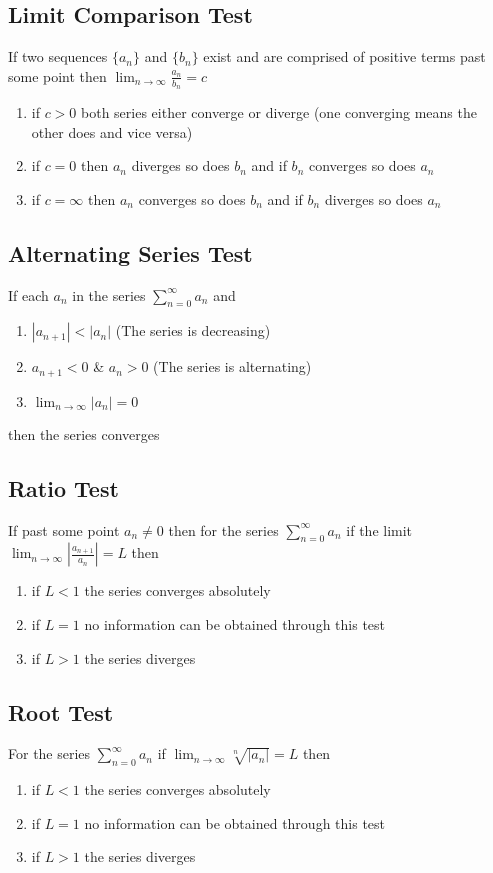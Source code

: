 \documentclass[10pt,landscape,letterpaper]{cheatsheet}
\begin{document}
\subsection*{Limit Comparison Test}
If two sequences $\{a_n\}$ and $\{b_n\}$ exist and are comprised of positive terms past some point then
$\lim_{n \to \infty} \frac{a_n}{b_n} =c$
\begin{enumerate}[label=(\alph*)]
        \item if $c>0$ both series either converge or diverge (one converging means the other does and vice versa)
        \item if $c=0$ then $a_n$ diverges so does $b_n$ and if $b_n$ converges so does $a_n$
        \item if $c=\infty$ then $a_n$ converges so does $b_n$ and if $b_n$ diverges so does $a_n$
\end{enumerate}
\subsection*{Alternating Series Test}
If each $a_n$ in the series $\sum_{n=0}^{\infty}a_n$ and
\begin{enumerate}[label=(\arabic*)]
        \item $|a_{n+1}|<|a_n|$ (The series is decreasing)
        \item $a_{n+1}<0$ \& $a_n>0$ (The series is alternating)
        \item $\lim_{n \to \infty} |a_n|=0$
\end{enumerate}
then the series converges
\subsection*{Ratio Test}
If past some point $a_n\neq 0$ then for the series $\sum_{n=0}^{\infty}a_n$
if the limit $\lim_{n \to \infty} \left|\frac{a_{n+1}}{a_n}\right|=L$ then
\begin{enumerate}[label=(\alph*)]
        \item if $L<1$ the series converges absolutely
        \item if $L=1$ no information can be obtained through this test
        \item if $L>1$ the series diverges
\end{enumerate}
\subsection*{Root Test}
For the series $\sum_{n=0}^{\infty}a_n$ if $\lim_{n \to \infty}\sqrt[n]{|a_n|}=L$ then
\begin{enumerate}[label=(\alph*)]
        \item if $L<1$ the series converges absolutely
        \item if $L=1$ no information can be obtained through this test
        \item if $L>1$ the series diverges
\end{enumerate}
\end{document}
